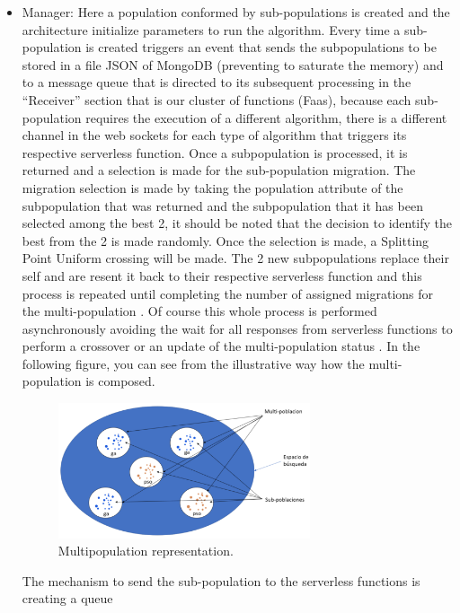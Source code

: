 \documentclass[runningheads]{llncs}
\begin{document}
\begin{itemize}
  \item Manager: 
  Here a population conformed by sub-populations is created and the architecture
 initialize parameters to run the algorithm. Every time a sub-population is created 
 triggers an event that sends the subpopulations to be stored in a file JSON of
 MongoDB (preventing to saturate the memory) and to a message queue that is
 directed to its subsequent processing in the “Receiver” section that is our cluster of functions (Faas), because each sub-population requires the execution
 of a different algorithm, there is a different channel in the web sockets for
 each type of algorithm that triggers its respective serverless function. Once a subpopulation is processed, 
 it is returned and a selection is made for the sub-population migration. The migration selection is made by taking 
 the population attribute of the subpopulation that was returned and the subpopulation that it has been selected 
 among the best 2, it should be noted that the decision to identify the best from the 2 is made randomly. 
 Once the selection is made, a Splitting Point Uniform crossing will be made. The 2 new
 subpopulations replace their self and are resent it back to their respective serverless function and this process is repeated until completing the number
 of assigned migrations for the multi-population \cite{Ma2019,Santander-jim2018}. Of course this whole process
 is performed asynchronously avoiding the wait for all responses from serverless
 functions to perform a crossover or an update of the multi-population status
 \cite{Lovbjerg2001,Jimeno2019}. In the following figure, you can see from
 the illustrative way how the multi-population is composed.
\begin{figure}[htp]
  \centering
  \includegraphics[width=0.7\textwidth]{img/multipopulation.png}
  \caption{Multipopulation representation.} \label{fig1}
  \end{figure}
  The mechanism to send the sub-population to the serverless functions is creating a queue

\end{itemize}
\end{document}
